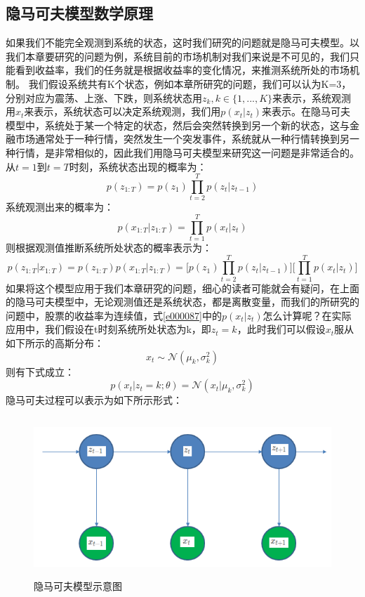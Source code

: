 \subsection{隐马可夫模型数学原理}
如果我们不能完全观测到系统的状态，这时我们研究的问题就是隐马可夫模型。以我们本章要研究的问题为例，系统目前的市场机制对我们来说是不可见的，我们只能看到收益率，我们的任务就是根据收益率的变化情况，来推测系统所处的市场机制。\newline
我们假设系统共有K个状态，例如本章所研究的问题，我们可以认为K=3，分别对应为震荡、上涨、下跌，则系统状态用$z_{k},k \in \{1,..., K\}$来表示，系统观测用$x_{t}$来表示，系统状态可以决定系统观测，我们用$p(x_{t} \vert z_{t})$来表示。在隐马可夫模型中，系统处于某一个特定的状态，然后会突然转换到另一个新的状态，这与金融市场通常处于一种行情，突然发生一个突发事件，系统就从一种行情转换到另一种行情，是非常相似的，因此我们用隐马可夫模型来研究这一问题是非常适合的。
从$t=1$到$t=T$时刻，系统状态出现的概率为：
\begin{equation}
p(z_{1:T}) = p(z_{1}) \prod_{t=2}^{T}p(z_{t} \vert z_{t-1})
\label{e000085}
\end{equation}
系统观测出来的概率为：
\begin{equation}
p(x_{1:T} \vert z_{1:T}) = \prod_{t=1}^{T} p(x_{t} \vert z_{t})
\label{e000086}
\end{equation}
则根据观测值推断系统所处状态的概率表示为：
\begin{equation}
p(z_{1:T} \vert x_{1:T}) = p(z_{1:T}) p(x_{1:T} \vert z_{1:T}) = \bigg[ p(z_{1}) \prod_{t=2}^{T}p(z_{t} \vert z_{t-1}) \bigg] \bigg[ \prod_{t=1}^{T} p(x_{t} \vert z_{t}) \bigg]
\label{e000087}
\end{equation}
如果将这个模型应用于我们本章研究的问题，细心的读者可能就会有疑问，在上面的隐马可夫模型中，无论观测值还是系统状态，都是离散变量，而我们的所研究的问题中，股票的收益率为连续值，式\ref{e000087}中的$p(x_{t} \vert z_{t})$怎么计算呢？在实际应用中，我们假设在t时刻系统所处状态为k，即$z_{t}=k$，此时我们可以假设$x_{t}$服从如下所示的高斯分布：
\begin{equation}
x_{t} \sim \mathcal{N}(\mu _{k}, \sigma _{k}^{2})
\label{e000088}
\end{equation}
则有下式成立：
\begin{equation}
p(x_{t} \vert z_{t}=k; \theta) = \mathcal{N} (x_{t} \vert \mu _{k}, \sigma _{k}^{2})
\label{e000089}
\end{equation}
隐马可夫过程可以表示为如下所示形式：
\begin{figure}[H]
	\caption{隐马可夫模型示意图}
	\label{f000069}
	\centering
	\includegraphics[height=6cm]{images/f000069}
\end{figure}
